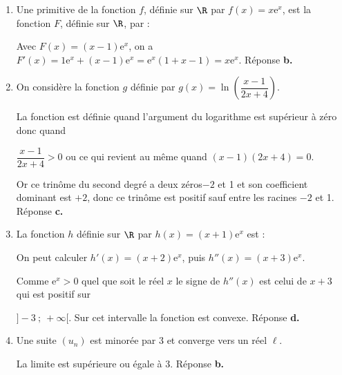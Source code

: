 \medskip












\medskip

\begin{enumerate}
\item Une primitive de la fonction $f$, définie sur $\R$ par $f(x) =x\text{e}^x$, est la fonction $F$, définie sur $\R$, par :






Avec $F(x) = (x - 1)\text{e}^x$, on a $F'(x) = 1\text{e}^x + (x - 1)\text{e}^x = \text{e}^x(1 + x - 1) = x\text{e}^x$. Réponse \textbf{b.}

\item On considère la fonction $g$ définie par $g(x) = \ln \left(\dfrac{x - 1}{2x+ 4}\right).$









La fonction est définie quand l'argument du logarithme est supérieur à zéro donc quand 

$\dfrac{x - 1}{2x+ 4} > 0$ ou ce qui revient au même quand $(x - 1)(2x + 4) = 0$.

Or ce trinôme du second degré a deux zéros$- 2$ et 1 et son coefficient dominant est $+ 2$, donc ce trinôme est positif sauf entre les racines $- 2$ et 1. Réponse \textbf{c.}
\item  La fonction $h$ définie sur $\R$ par $h(x)= (x + 1)\text{e}^{x}$ est :







On peut calculer $h'(x) = (x + 2)\text{e}^x$, puis $h''(x) = (x + 3)\text{e}^x$.

Comme $\text{e}^x > 0$ quel que soit le réel $x$ le signe de $h''(x)$ est celui de $x + 3$ qui est positif sur 

$]-3~;~+ \infty[$. Sur cet intervalle la fonction est convexe. Réponse \textbf{d.}

\item Une suite $\left(u_n\right)$ est minorée par 3 et converge vers un réel $\ell$.








La limite est supérieure ou égale à 3. Réponse \textbf{b.}


\end{enumerate}

